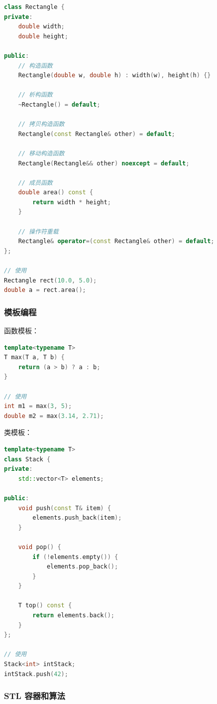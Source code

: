
\begin{lstlisting}[language=C++]
class Rectangle {
private:
    double width;
    double height;

public:
    // 构造函数
    Rectangle(double w, double h) : width(w), height(h) {}

    // 析构函数
    ~Rectangle() = default;

    // 拷贝构造函数
    Rectangle(const Rectangle& other) = default;

    // 移动构造函数
    Rectangle(Rectangle&& other) noexcept = default;

    // 成员函数
    double area() const {
        return width * height;
    }

    // 操作符重载
    Rectangle& operator=(const Rectangle& other) = default;
};

// 使用
Rectangle rect(10.0, 5.0);
double a = rect.area();
\end{lstlisting}

\subsubsection{模板编程}


函数模板：
\begin{lstlisting}[language=C++]
template<typename T>
T max(T a, T b) {
    return (a > b) ? a : b;
}

// 使用
int m1 = max(3, 5);
double m2 = max(3.14, 2.71);
\end{lstlisting}

类模板：
\begin{lstlisting}[language=C++]
template<typename T>
class Stack {
private:
    std::vector<T> elements;

public:
    void push(const T& item) {
        elements.push_back(item);
    }

    void pop() {
        if (!elements.empty()) {
            elements.pop_back();
        }
    }

    T top() const {
        return elements.back();
    }
};

// 使用
Stack<int> intStack;
intStack.push(42);
\end{lstlisting}

\subsubsection{STL 容器和算法}

